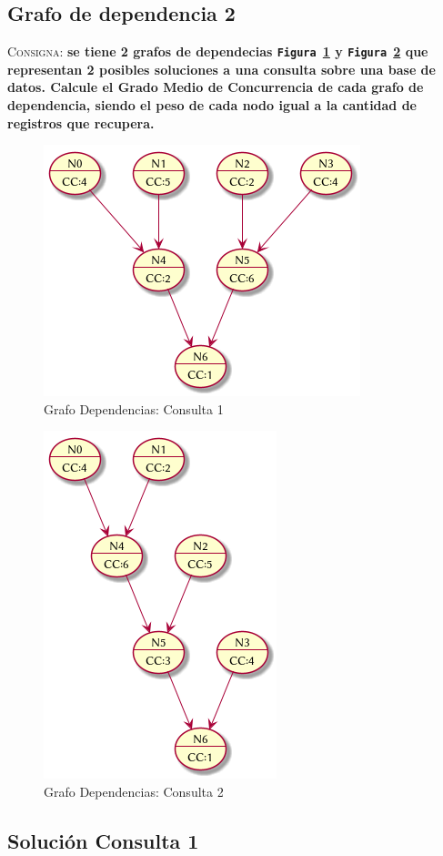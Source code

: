 \documentclass{article}
\begin{document}
\subsection{Grafo de dependencia 2}
\textsc{Consigna}: \textbf{se tiene 2 grafos de dependecias \texttt{Figura
\ref{gr:an1}} y \texttt{Figura \ref{gr:an2}} que representan 2 posibles
soluciones a una consulta sobre una base de datos. Calcule el Grado Medio de
Concurrencia de cada grafo de dependencia, siendo el peso de cada nodo igual a
la cantidad de registros que recupera.}

\begin{figure}[H]
  \centering
  \includegraphics[width=.4\linewidth]{gr_an1}
  \caption{Grafo Dependencias: Consulta 1}
  \label{gr:an1}
\end{figure}

\begin{figure}[H]
  \centering
  \includegraphics[width=.4\linewidth]{gr_an2}
  \caption{Grafo Dependencias: Consulta 2}
  \label{gr:an2}
\end{figure}

\subsection{Soluci\'on Consulta 1}
\end{document}

